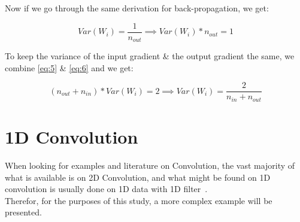 \documentclass[a4paper, 12pt]{report}
\begin{document}
Now if we go through the same derivation for back-propagation, we get:
\begin{center}
	\begin{equation}
	Var(W_i) = \frac{1}{n_{out}} \implies Var(W_i) * n_{out} = 1 \label{eq:6}
	\end{equation}
\end{center}
To keep the variance of the input gradient \& the output gradient the same, we combine
\eqref{eq:5} \& \eqref{eq:6} and we get:
\begin{center}
	\begin{equation}
	(n_{out} + n_{in}) * Var(W_i) = 2 \implies Var(W_i) = \frac{2}{n_{in} + n_{out}} \label{eq:7}
	\end{equation}
\end{center}
\newpage
\section{\textbf{1D Convolution}}\label{Conv1D}
When looking for examples and literature on Convolution, the vast majority of what is available is on 2D Convolution, and what might be found on 1D convolution is usually done on 1D data with 1D filter~\citep{math-behind-1d-convolution-with-advanced-examples-in-tf}.\\
Therefor, for the purposes of this study, a more complex example will be presented.
\end{document}
